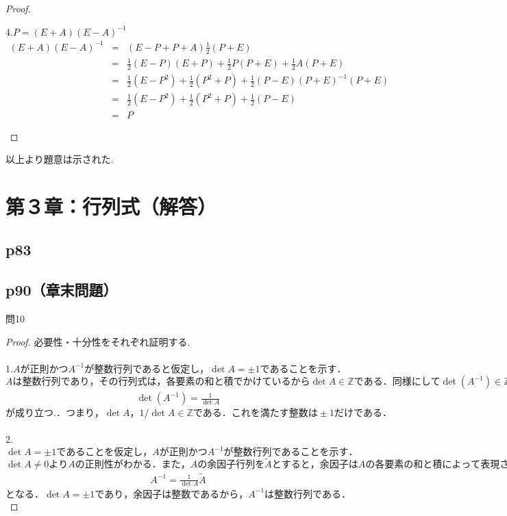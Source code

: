 \documentclass[dvipdfmx,uplatex,11pt]{jsarticle}
\begin{document}
\begin{proof}
%
%
%
\newpage
%
%
%
\begin{leftbar}
4.$P= (E + A)(E − A)^{−1}$
\begin{eqnarray*}
(E + A)(E − A)^{−1}&=&(E − P + P + A)\frac{1}{2}(P + E)\\
&=&\frac{1}{2}(E − P)(E + P)+\frac{1}{2}P(P + E)+\frac{1}{2}A(P + E)\\
&=&\frac{1}{2}(E − P^2) +\frac{1}{2}(P^2+P)+\frac{1}{2}(P − E)(P + E)^{−1}(P + E)\\
&=&\frac{1}{2}(E − P^2)+\frac{1}{2}(P^2+P)+\frac{1}{2}(P − E)\\
&=&P
\end{eqnarray*}
\end{leftbar}
\end{proof}
以上より題意は示された.
%
%
%
\newpage
%
%
%
\section{第３章：行列式（解答）}
\subsection{p83}
%
%
%
\newpage
%
%
%
\subsection{p90（章末問題）}
問10\\
\noindent
\begin{leftbar}
\begin{proof}
必要性・十分性をそれぞれ証明する.\\ \\
1.$Aが正則かつA^{−1}が整数行列であると仮定し，\det A=\pm 1であることを示す．$\\
$Aは整数行列であり，その行列式は，各要素の和と積でかけているから\det A \in \mathbb{Z}である．同様にして\det (A^{−1}) \in \mathbb{Z}である．逆行列の行列式は，$
\begin{eqnarray*}
\det (A^{−1})=\frac{1}{\det A}
\end{eqnarray*}
$が成り立つ.．つまり，\det A，1/\det A \in \mathbb{Z} である．これを満たす整数は\pm 1だけである．$\\
\\
2.$\det A=\pm 1であることを仮定し，Aが正則かつA^{−1}が整数行列であることを示す．$\\
$\det A \neq 0 より A の正則性がわかる．また，Aの余因子行列を\tilde{A}とすると，余因子はAの各要素の和と積によって表現される．つまり，余因子は整数であるから\tilde{A}は整数行列である. また$
\begin{eqnarray*}
A^{−1}=\frac{1}{\det A}\tilde{A}
\end{eqnarray*}
$となる．\det A=\pm 1であり， 余因子は整数であるから，A^{−1}は整数行列である．$
\end{proof}
\end{leftbar}
%
%
%
\newpage
%
%
%
\end{document}
